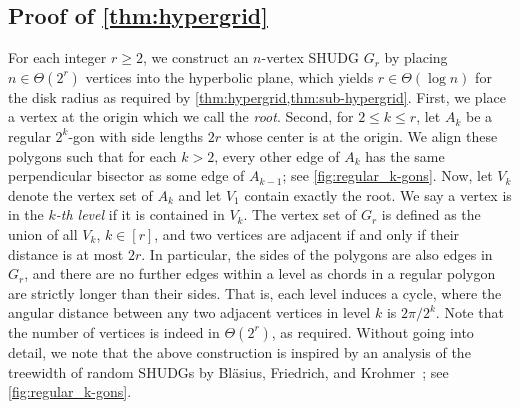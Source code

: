 %
%
\subsection{Proof of \texorpdfstring{\cref{thm:hypergrid}}{Theorem 8}}
\label{sec:lower_bound_tw_logn}
%
%
For each integer $ r \geq 2 $, we construct an $n$-vertex SHUDG $G_r$ by placing $ n \in \Theta(2^r) $ vertices into the hyperbolic plane, which yields $ r \in \Theta(\log n) $ for the disk radius as required by \cref{thm:hypergrid,thm:sub-hypergrid}.
First, we place a vertex at the origin which we call the \emph{root}.
Second, for $ 2 \leq k \leq r $, let $ A_k $ be a regular $ 2^k $-gon with side lengths $ 2r $ whose center is at the origin.
We align these polygons such that for each $ k > 2 $, every other edge of $ A_k $ has the same perpendicular bisector as some edge of $ A_{k-1} $; see \cref{fig:regular_k-gons}.
Now, let $ V_k $ denote the vertex set of $ A_k $ and let $ V_1 $ contain exactly the root.
We say a vertex is in the \emph{$k$-th level} if it is contained in $ V_k $.
The vertex set of $ G_r $ is defined as the union of all $ V_k $, $ k \in [r] $, and two vertices are adjacent if and only if their distance is at most $ 2r $.
In particular, the sides of the polygons are also edges in $ G_r $, and there are no further edges within a level as chords in a regular polygon are strictly longer than their sides.
That is, each level induces a cycle, where the angular distance between any two adjacent vertices in level $ k $ is $ 2 \pi / 2^k $.
Note that the number of vertices is indeed in $ \Theta(2^r) $, as required.
%
Without going into detail, we note that the above construction is inspired by an analysis of the treewidth of random SHUDGs by Bläsius, Friedrich, and Krohmer~\cite{blasius_hyperbolic_2016}; see \cref{fig:regular_k-gons}.
